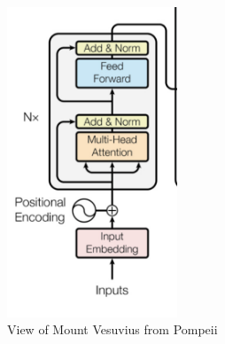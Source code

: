 \documentclass[12pt]{article}
\begin{document}
\begin{figure}[h!]
\centering
\includegraphics[width=2in]
{encoder.jpg}
\caption{View of Mount Vesuvius from
  Pompeii}
\label{fig-jpg}
\end{figure}
\end{document}
